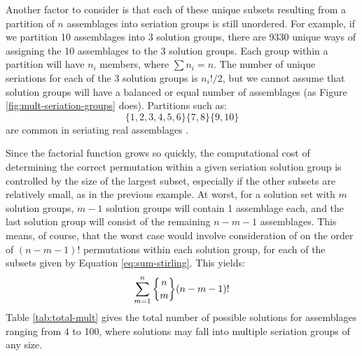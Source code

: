 Another factor to consider is that each of these unique subsets resulting from a partition of $n$ assemblages into seriation groups is still unordered.  For example, if we partition 10 assemblages into 3 solution groups, there are 9330 unique ways of assigning the 10 assemblages to the 3 solution groups.  Each group within a partition will have $n_i$ members, where $\sum n_i = n$.   The number of unique seriations for each of the 3 solution groups is $n_i ! / 2$, but we cannot assume that solution groups will have a balanced or equal number of assemblages (as Figure \ref{fig:mult-seriation-groups} does).  Partitions such as:
\begin{equation*}
\{1,2,3,4,5,6\} \{7,8\} \{9,10\}  
\end{equation*}
are common in seriating real assemblages \citep{Lipo2001}.   







Since the factorial function grows so quickly, the computational cost of determining the correct permutation within a given seriation solution group is controlled by the size of the largest subset, especially if the other subsets are relatively small, as in the previous example.  At worst, for a solution set with $m$ solution groups, $m-1$ solution groups will contain 1 assemblage each, and the last solution group will consist of the remaining $n-m-1$ assemblages.  This means, of course, that the worst case would involve consideration of on the order of $(n-m-1)!$ permutations within each solution group, for each of the subsets given by Equation \ref{eq:sum-stirling}.  This yields:
\begin{equation}
\sum_{m=1}^n \stirlingsubset{n}{m} (n-m-1)!
\end{equation}
Table \ref{tab:total-mult} gives the total number of possible solutions for assemblages ranging from 4 to 100, where solutions may fall into multiple seriation groups of any size.  

